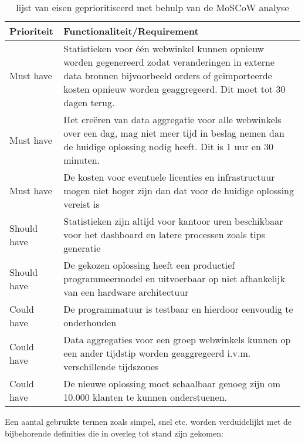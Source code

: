\begin{table}[bh]
\centering
\caption{lijst van eisen geprioritiseerd met behulp van de MoSCoW analyse}
\label{table:requirements}
\def\arraystretch{1.5}

\begin{tabular}{|l|p{12.5cm}|}
\hline
\textbf{Prioriteit} & \textbf{Functionaliteit/Requirement}
\\ \hline
Must have           & Statistieken voor één webwinkel kunnen opnieuw worden gegenereerd zodat veranderingen in externe data bronnen bijvoorbeeld orders of geïmporteerde kosten opnieuw worden geaggregeerd. Dit moet tot 30 dagen terug.
\\ \hline
Must have           & Het creëren van data aggregatie voor alle webwinkels over een dag, mag niet meer tijd in beslag nemen dan de huidige oplossing nodig heeft. Dit is 1 uur en 30 minuten.
\\ \hline
Must have           & De kosten voor eventuele licenties en infrastructuur mogen niet hoger zijn dan dat voor de huidige oplossing vereist is
\\ \hline
Should have         & Statistieken zijn altijd voor kantoor uren beschikbaar voor het dashboard en latere processen zoals tips generatie
\\ \hline
Should have         & De gekozen oplossing heeft een productief programmeermodel en uitvoerbaar op niet afhankelijk van een hardware architectuur
\\ \hline
Could have         & De programmatuur is testbaar en hierdoor eenvoudig te onderhouden
\\ \hline
Could have          & Data aggregaties voor een groep webwinkels kunnen op een ander tijdstip worden geaggregeerd i.v.m. verschillende tijdszones
\\ \hline
Could have         & De nieuwe oplossing moet schaalbaar genoeg zijn om 10.000 klanten te kunnen onderstuenen.
\\ \hline
\end{tabular}
\end{table}

Een aantal gebruikte termen zoals simpel, snel etc. worden verduidelijkt met de bijbehorende definities die in overleg tot stand zijn gekomen:

